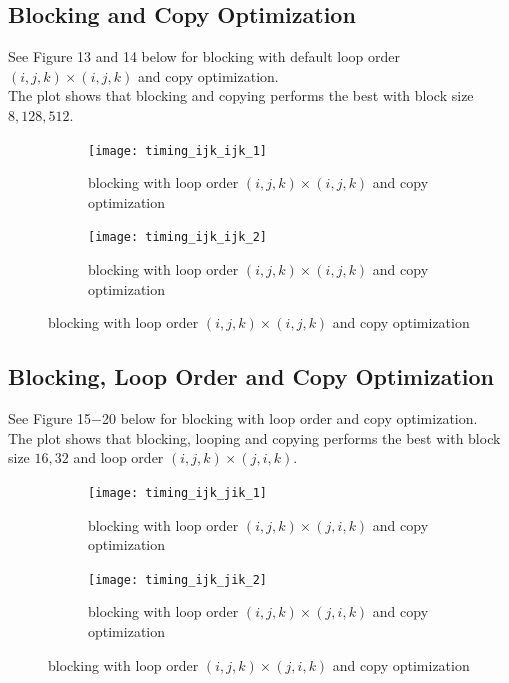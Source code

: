 \documentclass[12pt]{article}
\numberwithin{equation}{section}
\begin{document}
\subsection{Blocking and Copy Optimization}

See Figure 13 and 14 below for blocking with default loop order $(i, j, k)\times(i, j, k)$ and copy optimization.
\\
The plot shows that blocking and copying performs the best with block size $8, 128, 512$.

\begin{figure}[!ht]
   \begin{subfigure}
      \centering
        \begin{center}
      \texttt{[image: timing\_ijk\_ijk\_1]}
        \end{center}
      \label{aload0}
      \caption{blocking with loop order $(i, j, k)\times(i, j, k)$ and copy optimization}
  \end{subfigure}
  \begin{subfigure}
      \centering
        \begin{center}
      \texttt{[image: timing\_ijk\_ijk\_2]}
        \end{center}
      \label{aload1}
      \caption{blocking with loop order $(i, j, k)\times(i, j, k)$ and copy optimization}
  \end{subfigure}

\end{figure}

\subsection{Blocking, Loop Order and Copy Optimization}

See Figure 15$-$20 below for blocking with loop order and copy optimization.
\\
The plot shows that blocking, looping and copying performs the best with block size $16, 32$ and loop order $(i, j, k)\times(j, i, k)$.

\begin{figure}[!ht]
   \begin{subfigure}
      \centering
        \begin{center}
      \texttt{[image: timing\_ijk\_jik\_1]}
        \end{center}
      \label{aload0}
      \caption{blocking with loop order $(i, j, k)\times(j, i, k)$ and copy optimization}
  \end{subfigure}
  \begin{subfigure}
      \centering
        \begin{center}
      \texttt{[image: timing\_ijk\_jik\_2]}
        \end{center}
      \label{aload1}
      \caption{blocking with loop order $(i, j, k)\times(j, i, k)$ and copy optimization}
  \end{subfigure}

\end{figure}
\end{document}
